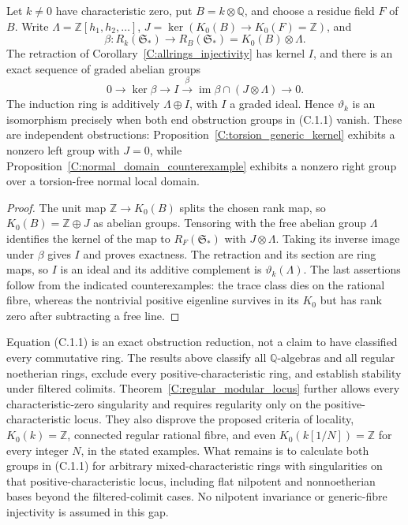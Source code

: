 \begin{proposition}
\label{C:allrings_obstructions}
Let $k\ne0$ have characteristic zero, put $B=k\otimes\mathbb Q$, and
choose a residue field $F$ of $B$. Write $\Lambda=\mathbb Z[h_1,h_2,\ldots]$,
$J=\ker(K_0(B)\to K_0(F)=\mathbb Z)$, and
\[
 \beta:R_k(\mathfrak S_*)\longrightarrow
       R_B(\mathfrak S_*)=K_0(B)\otimes\Lambda.
\]
The retraction of Corollary~\ref{C:allrings_injectivity} has kernel $I$,
and there is an exact sequence of graded abelian groups
\[
 0\longrightarrow\ker\beta\longrightarrow I
   \xrightarrow{\beta}
      \operatorname{im}\beta\cap(J\otimes\Lambda)
   \longrightarrow0.                                  \tag{C.1.1}
\]
The induction ring is additively $\Lambda\oplus I$, with $I$ a graded
ideal. Hence $\vartheta_k$ is an isomorphism precisely when both end
obstruction groups in (C.1.1) vanish. These are independent obstructions:
Proposition~\ref{C:torsion_generic_kernel} exhibits a nonzero left group
with $J=0$, while Proposition~\ref{C:normal_domain_counterexample}
exhibits a nonzero right group over a torsion-free normal local domain.
\end{proposition}
\begin{proof}
The unit map $\mathbb Z\to K_0(B)$ splits the chosen rank map, so
$K_0(B)=\mathbb Z\oplus J$ as abelian groups. Tensoring with the free
abelian group $\Lambda$ identifies the kernel of the map to
$R_F(\mathfrak S_*)$ with $J\otimes\Lambda$. Taking its inverse image
under $\beta$ gives $I$ and proves exactness. The retraction and its
section are ring maps, so $I$ is an ideal and its additive complement
is $\vartheta_k(\Lambda)$. The last assertions follow from the indicated
counterexamples: the trace class dies on the rational fibre, whereas
the nontrivial positive eigenline survives in its $K_0$ but has rank
zero after subtracting a free line.
\end{proof}

\begin{remark}
\label{C:allrings_open}\label{C:allrings_gate}
Equation (C.1.1) is an exact obstruction reduction, not a claim to have
classified every commutative ring. The results above classify all
$\mathbb Q$-algebras and all regular noetherian rings, exclude every
positive-characteristic ring, and establish stability under filtered
colimits. Theorem~\ref{C:regular_modular_locus} further allows every
characteristic-zero singularity and requires regularity only on the
positive-characteristic locus. They also disprove the proposed criteria of locality,
$K_0(k)=\mathbb Z$, connected regular rational fibre, and even
$K_0(k[1/N])=\mathbb Z$ for every integer $N$, in the stated examples.
What remains is to calculate both groups in (C.1.1) for arbitrary
mixed-characteristic rings with singularities on that positive-characteristic
locus, including flat nilpotent and nonnoetherian bases beyond the
filtered-colimit cases. No nilpotent
invariance or generic-fibre injectivity is assumed in this gap.
\end{remark}

